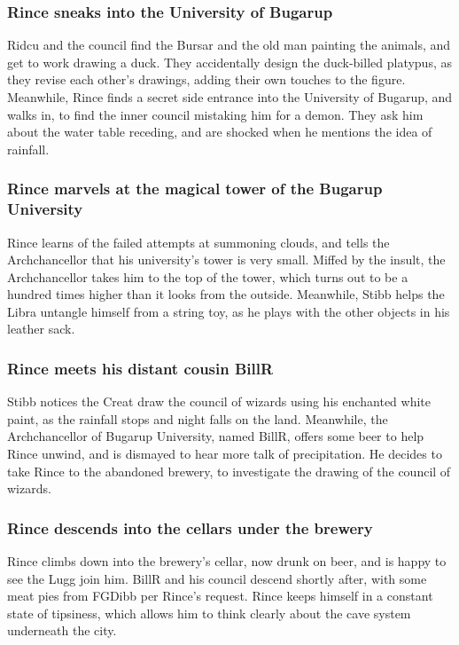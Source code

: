 \subsubsection{\Gls{Rince} sneaks into the University of Bugarup}
\Gls{Ridcu} and the council find the \Gls{Bursar} and the old man painting the animals, and get to
work drawing a duck. They accidentally design the duck-billed platypus, as they revise each other's
drawings, adding their own touches to the figure. Meanwhile, \Gls{Rince} finds a secret side
entrance into the University of Bugarup, and walks in, to find the inner council mistaking him for
a demon. They ask him about the water table receding, and are shocked when he mentions the idea of
rainfall.

\subsubsection{\Gls{Rince} marvels at the magical tower of the Bugarup University}
\Gls{Rince} learns of the failed attempts at summoning clouds, and tells the Archchancellor that
his university's tower is very small. Miffed by the insult, the Archchancellor takes him to the
top of the tower, which turns out to be a hundred times higher than it looks from the outside.
Meanwhile, \Gls{Stibb} helps the \Gls{Libra} untangle himself from a string toy, as he plays with
the other objects in his leather sack.

\subsubsection{\Gls{Rince} meets his distant cousin \Gls{BillR}}
\Gls{Stibb} notices the \Gls{Creat} draw the council of wizards using his enchanted white paint, as
the rainfall stops and night falls on the land. Meanwhile, the Archchancellor of Bugarup University,
named \Gls{BillR}, offers some beer to help \Gls{Rince} unwind, and is dismayed to hear more talk
of precipitation. He decides to take \Gls{Rince} to the abandoned brewery, to investigate the
drawing of the council of wizards.

\subsubsection{\Gls{Rince} descends into the cellars under the brewery}
\Gls{Rince} climbs down into the brewery's cellar, now drunk on beer, and is happy to see the
\Gls{Lugg} join him. \Gls{BillR} and his council descend shortly after, with some meat pies from
\Gls{FGDibb} per \Gls{Rince}'s request. \Gls{Rince} keeps himself in a constant state of tipsiness,
which allows him to think clearly about the cave system underneath the city.


